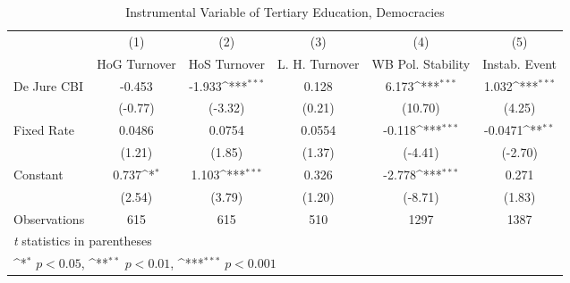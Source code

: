 \begin{table}[htbp]\centering
\def\sym#1{\ifmmode^{#1}\else\(^{#1}\)\fi}
\caption{Instrumental Variable of Tertiary Education, Democracies \label{demIfivs}}
\begin{tabular}{l*{5}{c}}
\toprule
                                        &\multicolumn{1}{c}{(1)}&\multicolumn{1}{c}{(2)}&\multicolumn{1}{c}{(3)}&\multicolumn{1}{c}{(4)}&\multicolumn{1}{c}{(5)}\\
                                        &\multicolumn{1}{c}{HoG Turnover}&\multicolumn{1}{c}{HoS Turnover}&\multicolumn{1}{c}{L. H. Turnover}&\multicolumn{1}{c}{WB Pol. Stability}&\multicolumn{1}{c}{Instab. Event}\\
\midrule
De Jure CBI                             &   -0.453         &   -1.933\sym{***}&    0.128         &    6.173\sym{***}&    1.032\sym{***}\\
                                        &  (-0.77)         &  (-3.32)         &   (0.21)         &  (10.70)         &   (4.25)         \\
\addlinespace
Fixed Rate                              &   0.0486         &   0.0754         &   0.0554         &   -0.118\sym{***}&  -0.0471\sym{**} \\
                                        &   (1.21)         &   (1.85)         &   (1.37)         &  (-4.41)         &  (-2.70)         \\
\addlinespace
Constant                                &    0.737\sym{*}  &    1.103\sym{***}&    0.326         &   -2.778\sym{***}&    0.271         \\
                                        &   (2.54)         &   (3.79)         &   (1.20)         &  (-8.71)         &   (1.83)         \\
\midrule
Observations                            &      615         &      615         &      510         &     1297         &     1387         \\
\bottomrule
\multicolumn{6}{l}{\footnotesize \textit{t} statistics in parentheses}\\
\multicolumn{6}{l}{\footnotesize \sym{*} \(p<0.05\), \sym{**} \(p<0.01\), \sym{***} \(p<0.001\)}\\
\end{tabular}
\end{table}
